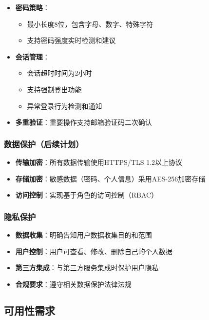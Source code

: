 \documentclass[a4paper]{article}
\begin{document}
\begin{itemize}
    \item \textbf{密码策略}：
    \begin{itemize}
        \item 最小长度8位，包含字母、数字、特殊字符
        \item 支持密码强度实时检测和建议
    \end{itemize}
    \item \textbf{会话管理}：
    \begin{itemize}
        \item 会话超时时间为2小时
        \item 支持强制登出功能
        \item 异常登录行为检测和通知
    \end{itemize}
    \item \textbf{多重验证}：重要操作支持邮箱验证码二次确认
\end{itemize}

\subsubsection{数据保护（后续计划）}

\begin{itemize}
    \item \textbf{传输加密}：所有数据传输使用HTTPS/TLS 1.2以上协议
    \item \textbf{存储加密}：敏感数据（密码、个人信息）采用AES-256加密存储
    \item \textbf{访问控制}：实现基于角色的访问控制（RBAC）
\end{itemize}

\subsubsection{隐私保护}

\begin{itemize}
    \item \textbf{数据收集}：明确告知用户数据收集目的和范围
    \item \textbf{用户控制}：用户可查看、修改、删除自己的个人数据
    \item \textbf{第三方集成}：与第三方服务集成时保护用户隐私
    \item \textbf{合规要求}：遵守相关数据保护法律法规
\end{itemize}

\subsection{可用性需求}
\end{document}
